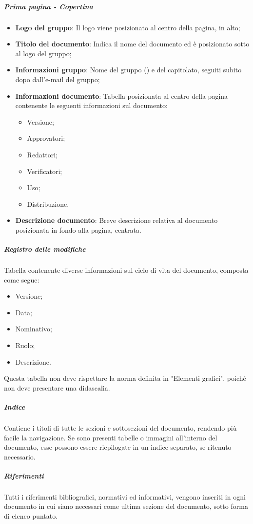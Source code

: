 \subparagraph*{Prima pagina - Copertina} 
\begin{itemize}
\item \textbf{Logo del gruppo}: Il logo viene posizionato al centro della pagina, in alto;
\item \textbf{Titolo del documento}: Indica il nome del documento ed è posizionato sotto al logo del gruppo;
\item \textbf{Informazioni gruppo}: Nome del gruppo (\Gruppo{}) e del capitolato, seguiti subito dopo dall'e-mail del gruppo; 
\item \textbf{Informazioni documento}: Tabella posizionata al centro della pagina contenente le seguenti informazioni sul documento:
\begin{itemize}
\item Versione;
\item Approvatori;
\item Redattori;
\item Verificatori;
\item Uso;
\item Distribuzione.
\end{itemize}
\item \textbf{Descrizione documento}: Breve descrizione relativa al documento posizionata in fondo alla pagina, centrata.
\end{itemize}
\subparagraph*{Registro delle modifiche}
Tabella contenente diverse informazioni sul ciclo di vita del documento, composta come segue:
\begin{itemize}
\item Versione;
\item Data;
\item Nominativo;
\item Ruolo;
\item Descrizione.
\end{itemize}
Questa tabella non deve rispettare la norma definita in "Elementi grafici", poiché non deve presentare una didascalia.

\subparagraph*{Indice}
Contiene i titoli di tutte le sezioni e sottosezioni del documento, rendendo più facile la navigazione.
Se sono presenti tabelle o immagini all'interno del documento, esse possono essere riepilogate in un indice separato, se ritenuto necessario.

\subparagraph*{Riferimenti}
Tutti i riferimenti bibliografici, normativi ed informativi, vengono inseriti in ogni documento in cui siano necessari come ultima sezione del documento, sotto forma di elenco puntato.

